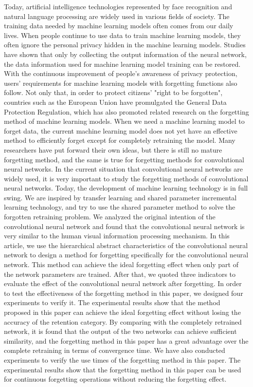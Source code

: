\begin{abstract*}
  Today, artificial intelligence technologies represented by face recognition and natural language processing are widely used in various fields of society. 
  The training data needed by machine learning models often comes from our daily lives.
  When people continue to use data to train machine learning models, they often ignore the personal privacy hidden in the machine learning models.
  Studies have shown that only by collecting the output information of the neural network, the data information used for machine learning model training can be restored. 
  With the continuous improvement of people's awareness of privacy protection, users' requirements for machine learning models with forgetting functions also follow.
  Not only that, in order to protect citizens' "right to be forgotten", countries such as the European Union have promulgated the General Data Protection Regulation, 
  which has also promoted related research on the forgetting method of machine learning models.
  When we need a machine learning model to forget data, the current machine learning model does not yet have an effective method to efficiently forget except for completely retraining the model.
  Many researchers have put forward their own ideas, but there is still no mature forgetting method, and the same is true for forgetting methods for convolutional neural networks. 
  In the current situation that convolutional neural networks are widely used, it is very important to study the forgetting methods of convolutional neural networks.
  Today, the development of machine learning technology is in full swing. We are inspired by transfer learning and shared parameter incremental learning technology, and try to use the shared parameter method to solve the forgotten retraining problem.  
  We analyzed the original intention of the convolutional neural network and found that the convolutional neural network is very similar to the human visual information processing mechanism.
  In this article, we use the hierarchical abstract characteristics of the convolutional neural network to design a method for forgetting specifically for the convolutional neural network. 
  This method can achieve the ideal forgetting effect when only part of the network parameters are trained.
  After that, we quoted three indicators to evaluate the effect of the convolutional neural network after forgetting.
  In order to test the effectiveness of the forgetting method in this paper, we designed four experiments to verify it. 
  The experimental results show that the method proposed in this paper can achieve the ideal forgetting effect without losing the accuracy of the retention category.
  By comparing with the completely retrained network, it is found that the output of the two networks can achieve sufficient similarity, 
  and the forgetting method in this paper has a great advantage over the complete retraining in terms of convergence time.
  We have also conducted experiments to verify the use times of the forgetting method in this paper. 
  The experimental results show that the forgetting method in this paper can be used for continuous forgetting operations without reducing the forgetting effect.

\end{abstract*}

